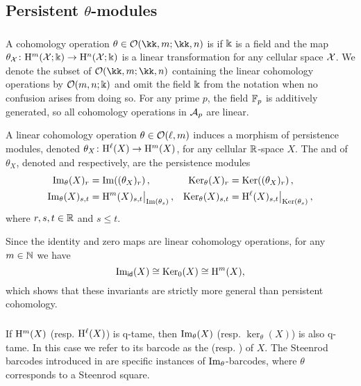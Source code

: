 
\subsection{Persistent $\theta$-modules}

\subsubsection{}\label{ss:theta-modules}

A cohomology operation $\theta \in \cO(\kk,m; \kk,n)$ is  if \(\Bbbk\) is a field and the map \(\theta_{\mathcal{X}} \colon \mathrm{H}^m(\mathcal{X}; \Bbbk) \to \mathrm{H}^n(\mathcal{X}; \Bbbk)\) is a linear transformation for any cellular space \(\mathcal{X}\).
We denote the subset of $\cO(\kk,m; \kk,n)$ containing the linear cohomology operations by $\mathcal{O}(m,n;\Bbbk)$ and omit the field \(\Bbbk\) from the notation when no confusion arises from doing so.
For any prime $p$, the field ${\mathbb{F}_p}$ is additively generated, so all cohomology operations in $\mathcal{A}_p$ are linear.

A linear cohomology operation \(\theta \in \mathcal{O}(\ell, m)\) induces a morphism of persistence modules, denoted \(\theta_X \colon \mathrm{H}^\ell(X) \to \mathrm{H}^m(X)\), for any cellular \(\mathbb{R}\)-space \(X\).
The  and  of $\theta_X$, denoted  and  respectively, are the persistence modules
\begin{align*}
	\operatorname{Im}_\theta(X)_r &= \operatorname{Im}((\theta_X)_r)\,, &
	\operatorname{Ker}_\theta(X)_r &= \operatorname{Ker}((\theta_X)_r)\,, \\
	\operatorname{Im}_\theta(X)_{s,t} &= \mathrm{H}^m(X)_{s,t}\big|_{\operatorname{Im}(\theta_s)}\,, &
	\operatorname{Ker}_\theta(X)_{s,t} &= \mathrm{H}^\ell(X)_{s,t}\big|_{\operatorname{Ker}(\theta_s)}\,,
\end{align*}
where \(r, s, t \in \mathbb{R}\) and \(s \leq t\).

Since the identity and zero maps are linear cohomology operations, for any \(m \in \mathbb{N}\) we have
\[
\operatorname{Im}_{\mathsf{id}}(X) \cong \operatorname{Ker}_0(X) \cong \mathrm{H}^m(X),
\]
which shows that these invariants are strictly more general than persistent cohomology.

\subsubsection{}\label{ss:theta-modules-q-tame}

If \(\mathrm{H}^m(X)\) (resp. \(\mathrm{H}^\ell(X)\)) is q-tame, then \(\operatorname{Im}_\theta(X)\) (resp. \(\ker_\theta(X)\)) is also q-tame.
In this case we refer to its barcode as the  (resp. ) of \(X\).
The Steenrod barcodes introduced in \cite{medina2022per_st} are specific instances of \(\operatorname{Im}_\theta\)-barcodes, where \(\theta\) corresponds to a Steenrod square.

